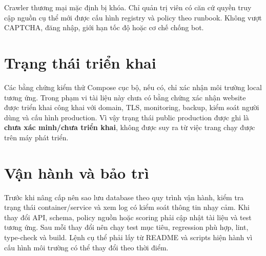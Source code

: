 Crawler thương mại mặc định bị khóa. Chỉ quản trị viên có căn cứ quyền truy cập nguồn cụ thể mới được cấu hình registry và policy theo runbook. Không vượt CAPTCHA, đăng nhập, giới hạn tốc độ hoặc cơ chế chống bot.

\section{Trạng thái triển khai}

Các bằng chứng kiểm thử Compose cục bộ, nếu có, chỉ xác nhận môi trường local tương ứng. Trong phạm vi tài liệu này chưa có bằng chứng xác nhận website được triển khai công khai với domain, TLS, monitoring, backup, kiểm soát người dùng và cấu hình production. Vì vậy trạng thái public production được ghi là \textbf{chưa xác minh/chưa triển khai}, không được suy ra từ việc trang chạy được trên máy phát triển.

\section{Vận hành và bảo trì}

Trước khi nâng cấp nên sao lưu database theo quy trình vận hành, kiểm tra trạng thái container/service và xem log có kiểm soát thông tin nhạy cảm. Khi thay đổi API, schema, policy nguồn hoặc scoring phải cập nhật tài liệu và test tương ứng. Sau mỗi thay đổi nên chạy test mục tiêu, regression phù hợp, lint, type-check và build. Lệnh cụ thể phải lấy từ README và scripts hiện hành vì cấu hình môi trường có thể thay đổi theo thời điểm.
